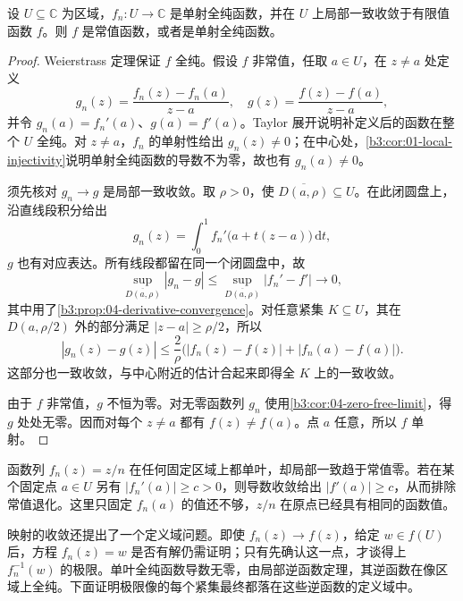 \begin{theorem}[单叶极限]\label{b3:thm:04-univalent-limit}
设 \(U\subseteq\mathbb C\) 为区域，\(f_n:U\rightarrow\mathbb C\) 是单射全纯函数，并在 \(U\) 上局部一致收敛于有限值函数 \(f\)。则 \(f\) 是常值函数，或者是单射全纯函数。
\end{theorem}
\begin{proof}
Weierstrass 定理保证 \(f\) 全纯。假设 \(f\) 非常值，任取 \(a\in U\)，在 \(z\ne a\) 处定义
\[
 g_n(z)=\frac{f_n(z)-f_n(a)}{z-a},
 \quad g(z)=\frac{f(z)-f(a)}{z-a},
\]
并令 \(g_n(a)=f_n'(a)\)、\(g(a)=f'(a)\)。Taylor 展开说明补定义后的函数在整个 \(U\) 全纯。对 \(z\ne a\)，\(f_n\) 的单射性给出 \(g_n(z)\ne0\)；在中心处，\cref{b3:cor:01-local-injectivity}说明单射全纯函数的导数不为零，故也有 \(g_n(a)\ne0\)。

须先核对 \(g_n\rightarrow g\) 是局部一致收敛。取 \(\rho>0\)，使 \(\overline{D(a,\rho)}\subseteq U\)。在此闭圆盘上，沿直线段积分给出
\[
 g_n(z)=\int_0^1 f_n'\bigl(a+t(z-a)\bigr)\,\mathrm{d}t,
\]
\(g\) 也有对应表达。所有线段都留在同一个闭圆盘中，故
\[
 \sup_{\overline{D(a,\rho)}}|g_n-g|
 \le\sup_{\overline{D(a,\rho)}}|f_n'-f'|\longrightarrow0,
\]
其中用了\cref{b3:prop:04-derivative-convergence}。对任意紧集 \(K\subseteq U\)，其在 \(D(a,\rho/2)\) 外的部分满足 \(|z-a|\ge\rho/2\)，所以
\[
 |g_n(z)-g(z)|
 \le\frac2\rho\bigl(|f_n(z)-f(z)|+|f_n(a)-f(a)|\bigr).
\]
这部分也一致收敛，与中心附近的估计合起来即得全 \(K\) 上的一致收敛。

由于 \(f\) 非常值，\(g\) 不恒为零。对无零函数列 \(g_n\) 使用\cref{b3:cor:04-zero-free-limit}，得 \(g\) 处处无零。因而对每个 \(z\ne a\) 都有 \(f(z)\ne f(a)\)。点 \(a\) 任意，所以 \(f\) 单射。
\end{proof}

函数列 \(f_n(z)=z/n\) 在任何固定区域上都单叶，却局部一致趋于常值零。若在某个固定点 \(a\in U\) 另有 \(|f_n'(a)|\ge c>0\)，则导数收敛给出 \(|f'(a)|\ge c\)，从而排除常值退化。这里只固定 \(f_n(a)\) 的值还不够，\(z/n\) 在原点已经具有相同的函数值。

\ProseParagraphBreak

映射的收敛还提出了一个定义域问题。即使 \(f_n(z)\rightarrow f(z)\)，给定 \(w\in f(U)\) 后，方程 \(f_n(z)=w\) 是否有解仍需证明；只有先确认这一点，才谈得上 \(f_n^{-1}(w)\) 的极限。单叶全纯函数导数无零，由局部逆函数定理，其逆函数在像区域上全纯。下面证明极限像的每个紧集最终都落在这些逆函数的定义域中。

